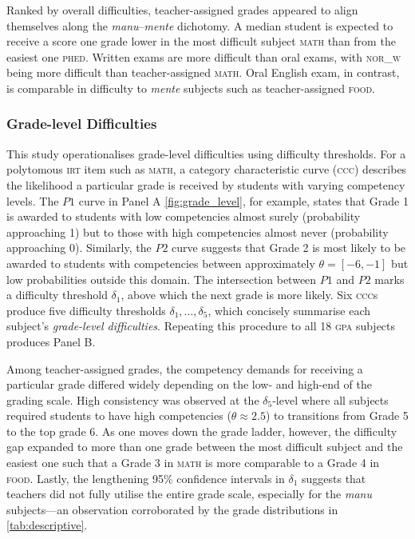 Ranked by overall difficulties, teacher-assigned grades appeared to align themselves along the \textit{manu}--\textit{mente} dichotomy. A median student is expected to receive a score one grade lower in the most difficult subject \textsc{math} than from the easiest one \textsc{phed}. Written exams are more difficult than oral exams, with \textsc{nor\_w} being more difficult than teacher-assigned \textsc{math}. Oral English exam, in contrast, is comparable in difficulty to \textit{mente} subjects such as teacher-assigned \textsc{food}.

\subsubsection{Grade-level Difficulties}
This study operationalises grade-level difficulties using difficulty thresholds. For a polytomous \textsc{irt} item such as \textsc{math}, a category characteristic curve (\textsc{ccc}) describes the likelihood a particular grade is received by students with varying competency levels. The $P1$ curve in Panel A \cref{fig:grade_level}, for example, states that Grade 1 is awarded to students with low competencies almost surely (probability approaching 1) but to those with high competencies almost never (probability approaching 0). Similarly, the $P2$ curve suggests that Grade 2 is most likely to be awarded to students with competencies between approximately $\theta=[-6, -1]$ but low probabilities outside this domain. The intersection between $P1$ and $P2$ marks a difficulty threshold $\delta_1$, above which the next grade is more likely. Six \textsc{ccc}s produce five difficulty thresholds $\delta_1, \dots, \delta_5$, which concisely summarise each subject's \emph{grade-level difficulties}. Repeating this procedure to all 18 \textsc{gpa} subjects produces Panel B.

Among teacher-assigned grades, the competency demands for receiving a particular grade differed widely depending on the low- and high-end of the grading scale. High consistency was observed at the $\delta_5$-level where all subjects required students to have high competencies ($\theta \approx 2.5$) to transitions from Grade 5 to the top grade 6. As one moves down the grade ladder, however, the difficulty gap expanded to more than one grade between the most difficult subject and the easiest one such that a Grade 3 in \textsc{math} is more comparable to a Grade 4 in \textsc{food}. Lastly, the lengthening 95\% confidence intervals in $\delta_1$ suggests that teachers did not fully utilise the entire grade scale, especially for the \textit{manu} subjects---an observation corroborated by the grade distributions in \cref{tab:descriptive}.

